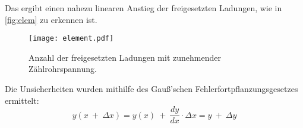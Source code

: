 Das ergibt einen nahezu linearen Anstieg der freigesetzten Ladungen, wie in \autoref{fig:elem} zu erkennen ist.

\begin{figure}[htbp]
  \centering
  \texttt{[image: element.pdf]}
  \caption{Anzahl der freigesetzten Ladungen mit zunehmender Zählrohrspannung.}
  \label{fig:elem}
\end{figure}

Die Unsicherheiten wurden mithilfe des Gauß'schen Fehlerfortpflanzungsgesetzes ermittelt:
\begin{equation}
  y(x\ +\ \Delta x) = y(x)\ +\ \frac{dy}{dx}\cdot \Delta x = y\ +\ \Delta y
  \label{eq:gauss}
\end{equation}